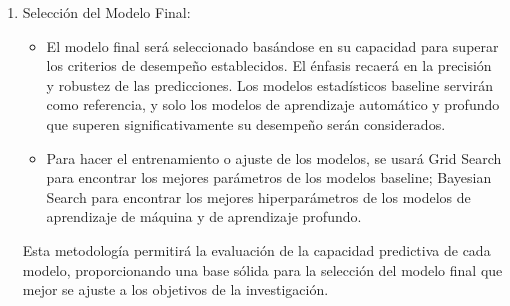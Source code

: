 \documentclass[twoside,11pt]{article}
\begin{document}
\begin{enumerate}
\begin{itemize}
    Los criterios de desempeño mínimo que los modelos de aprendizaje automático y profundo deben superar en comparación con los modelos estadísticos baseline son los resultados de estas tres métricas en los mejores estimadores para los modelos baseline.
\end{itemize}
\item Selección del Modelo Final:
\begin{itemize}
    \item El modelo final será seleccionado basándose en su capacidad para superar los criterios de desempeño establecidos. El énfasis recaerá en la precisión y robustez de las predicciones. Los modelos estadísticos baseline servirán como referencia, y solo los modelos de aprendizaje automático y profundo que superen significativamente su desempeño serán considerados.
    \item Para hacer el entrenamiento o ajuste de los modelos, se usará Grid Search para encontrar los mejores parámetros de los modelos baseline; Bayesian Search para encontrar los mejores hiperparámetros de los modelos de aprendizaje de máquina y de aprendizaje profundo.
\end{itemize}
Esta metodología permitirá la evaluación de la capacidad predictiva de cada modelo, proporcionando una base sólida para la selección del modelo final que mejor se ajuste a los objetivos de la investigación.
\end{enumerate}
\end{document}
